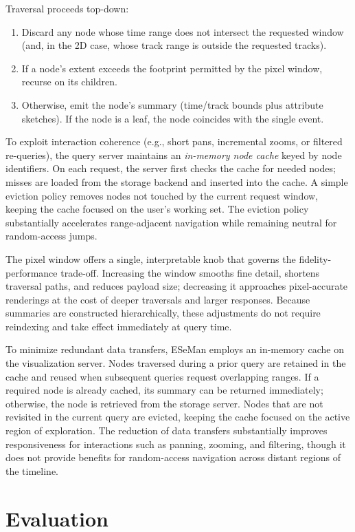 \begin{refsection}
Traversal proceeds top-down:
\begin{enumerate}
  \item Discard any node whose time range does not intersect the requested window (and, in the 2D case, whose track range is outside the requested tracks).
  \item If a node's extent exceeds the footprint permitted by the pixel window, recurse on its children.
  \item Otherwise, emit the node's summary (time/track bounds plus attribute sketches). If the node is a leaf, the node coincides with the single event.
\end{enumerate}

To exploit interaction coherence (e.g., short pans, incremental zooms, or filtered re-queries), the query server maintains an \emph{in-memory node cache} keyed by node identifiers. On each request, the server first checks the cache for needed nodes; misses are loaded from the storage backend and inserted into the cache. A simple eviction policy removes nodes not touched by the current request window, keeping the cache focused on the user's working set. The eviction policy substantially accelerates range-adjacent navigation while remaining neutral for random-access jumps.

The pixel window offers a single, interpretable knob that governs the fidelity-performance trade-off. Increasing the window smooths fine detail, shortens traversal paths, and reduces payload size; decreasing it approaches pixel-accurate renderings at the cost of deeper traversals and larger responses. Because summaries are constructed hierarchically, these adjustments do not require reindexing and take effect immediately at query time.

To minimize redundant data transfers, ESeMan employs an in-memory cache on the visualization server. Nodes traversed during a prior query are retained in the cache and reused when subsequent queries request overlapping ranges. If a required node is already cached, its summary can be returned immediately; otherwise, the node is retrieved from the storage server. Nodes that are not revisited in the current query are evicted, keeping the cache focused on the active region of exploration. The reduction of data transfers substantially improves responsiveness for interactions such as panning, zooming, and filtering, though it does not provide benefits for random-access navigation across distant regions of the timeline.


\section{Evaluation}
\label{sec:eval}


\end{refsection}
